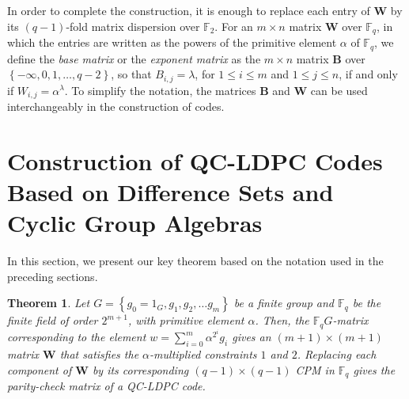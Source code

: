 \documentclass[journal,draftclsnofoot,onecolumn,12pt,twoside]{IEEEtran}
\newtheorem{theorem}{Theorem}
\begin{document}
In order to complete the construction, it is enough to replace each entry of $\mathbf{W}$ by its $(q-1)$-fold matrix dispersion over $\mathbb{F}_2$.
For an $m\times n$ matrix $\mathbf{W}$ over $\mathbb{F}_q$, in which the entries are written as the powers of the primitive element $\alpha$ of $\mathbb{F}_q$, we define the \emph{base matrix} or the \emph{exponent matrix} as the $m\times n$ matrix $\mathbf{B}$ over $\left\{-\infty,0,1,\ldots,q-2\right\}$, so that $B_{i,j}=\lambda$, for $1\leq i\leq m$ and $1\leq j\leq n$, if and only if $W_{i,j}=\alpha^{\lambda}$. To simplify the notation, the matrices $\mathbf{B}$ and $\mathbf{W}$ can be used interchangeably in the construction of codes.
\section{Construction of QC-LDPC Codes Based on Difference Sets and Cyclic Group Algebras}\label{sec4}
In this section, we present our key theorem based on the notation used in the preceding sections.
\begin{theorem}\label{theorem2}
Let $G=\left\{g_0=1_{G},g_1,g_2,\ldots g_m\right\}$ be a finite group and $\mathbb{F}_q$ be the finite field of order $2^{m+1}$,  with  primitive element $\alpha$. Then, the $\mathbb{F}_qG$-matrix corresponding to the element $w=\sum_{i=0}^{m}\alpha^{2^i}g_i$ gives an $(m+1)\times (m+1)$ matrix  $\mathbf{W}$ that satisfies  the $\alpha$-multiplied constraints $1$ and $2$. Replacing each component of $\mathbf{W}$ by its corresponding $(q-1)\times(q-1)$ CPM in $\mathbb{F}_q$ gives the  parity-check matrix of a  QC-LDPC code.
\end{theorem}
\end{document}
